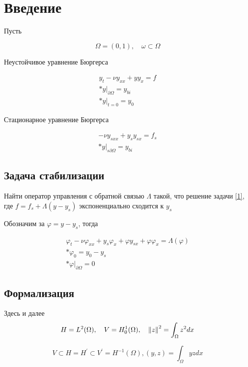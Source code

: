 \section{Введение}

Пусть

\begin{equation}
    \Omega = (0, 1), \quad \omega \subset \Omega
\end{equation}

Неустойчивое уравнение Бюргерса

\begin{gather}\label{1}
    y_t - \nu y_{xx} + yy_x = f \\*
    y|_{\partial \Omega} = y_{bi} \\*
    y|_{t=0} = y_0
\end{gather}

Стационарное уравнение Бюргерса

\begin{gather}
    -\nu y_{sxx} + y_s y_{sx} = f_s \\*
    y|_{s \partial \Omega} = y_{bi}
\end{gather}

\subsection{Задача стабилизации}
Найти оператор управления с обратной связью $\Lambda$ такой, что решение задачи
\eqref{1}, где $f = f_s + \Lambda (y - y_s)$ экспоненциально сходится к $y_s$

Обозначим за $\varphi = y - y_s$, тогда

\begin{gather}
    \varphi_t - \nu \varphi_{xx} + y_s \varphi_x + \varphi y_{sx} + \varphi
    \varphi_x = \Lambda(\varphi) \\*
    \varphi_0 = y_0 - y_s \\*
    \varphi|_{\partial \Omega} = 0
\end{gather}

\subsection{Формализация}
Здесь и далее
\begin{equation}
    H = L^2(\Omega), \quad V = H^1_0(\Omega), \quad \left\lVert z\right\rVert^2 = \int_{\Omega}{z^2dx}
\end{equation}

\begin{equation}
    V \subset H = H^{'} \subset V^{'} = H^{-1}(\Omega), (y, z) =
    \int_{\Omega}{yzdx}
\end{equation}

